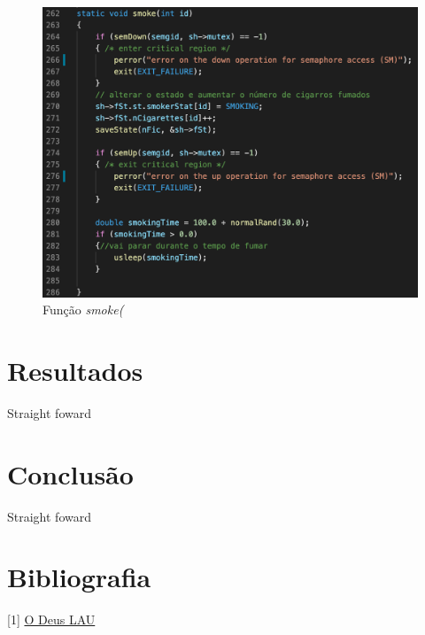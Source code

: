 \documentclass[10pt,portuguese]{article}
\begin{document}
\begin{figure}[!h]
    \centering
    \includegraphics[width=\textwidth]{images/implementation/smoke.png}
    \caption{Função \textit{smoke(}}
\end{figure}



\clearpage

\section{Resultados}

Straight foward

\clearpage

\section{Conclusão}

Straight foward

\clearpage

\section{Bibliografia}





\vspace{5mm} %

[1] \url{O Deus LAU}
\end{document}

